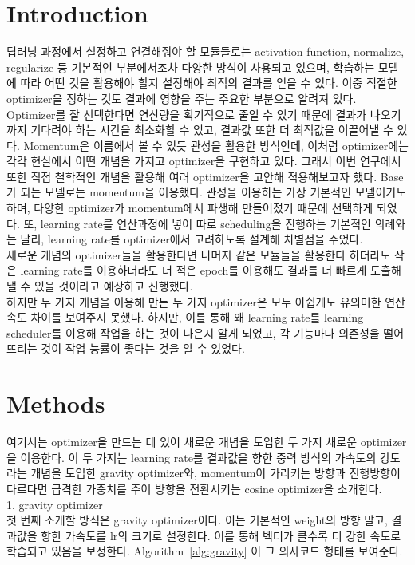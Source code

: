 \documentclass{article}
\begin{document}
\section{Introduction}
딥러닝 과정에서 설정하고 연결해줘야 할 모듈들로는 activation function, normalize, regularize 등 기본적인 부분에서조차 다양한 방식이 사용되고 있으며, 학습하는 모델에 따라 어떤 것을 활용해야 할지 설정해야 최적의 결과를 얻을 수 있다. 이중 적절한 optimizer을 정하는 것도 결과에 영향을 주는 주요한 부분으로 알려져 있다. Optimizer를 잘 선택한다면 연산량을 획기적으로 줄일 수 있기 때문에 결과가 나오기까지 기다려야 하는 시간을 최소화할 수 있고, 결과값 또한 더 최적값을 이끌어낼 수 있다. Momentum은 이름에서 볼 수 있듯 관성을 활용한 방식인데, 이처럼 optimizer에는 각각 현실에서 어떤 개념을 가지고 optimizer을 구현하고 있다. 그래서 이번 연구에서 또한 직접 철학적인 개념을 활용해 여러 optimizer을 고안해 적용해보고자 했다.
Base가 되는 모델로는 momentum을 이용했다. 관성을 이용하는 가장 기본적인 모델이기도 하며, 다양한 optimizer가 momentum에서 파생해 만들어졌기 때문에 선택하게 되었다. 또, learning rate를 연산과정에 넣어 따로 scheduling을 진행하는 기본적인 의례와는 달리, learning rate를 optimizer에서 고려하도록 설계해 차별점을 주었다.\\
새로운 개념의 optimizer들을 활용한다면 나머지 같은 모듈들을 활용한다 하더라도 작은 learning rate를 이용하더라도 더 적은 epoch를 이용해도 결과를 더 빠르게 도출해낼 수 있을 것이라고 예상하고 진행했다.\\
하지만 두 가지 개념을 이용해 만든 두 가지 optimizer은 모두 아쉽게도 유의미한 연산 속도 차이를 보여주지 못했다. 하지만, 이를 통해 왜 learning rate를 learning scheduler를 이용해 작업을 하는 것이 나은지 알게 되었고, 각 기능마다 의존성을 떨어뜨리는 것이 작업 능률이 좋다는 것을 알 수 있었다.

\section{Methods}
여기서는 optimizer을 만드는 데 있어 새로운 개념을 도입한 두 가지 새로운 optimizer을 이용한다. 이 두 가지는 learning rate를 결과값을 향한 중력 방식의 가속도의 강도라는 개념을 도입한 gravity optimizer와, momentum이 가리키는 방향과 진행방향이 다르다면 급격한 가중치를 주어 방향을 전환시키는 cosine optimizer을 소개한다.\\
1. gravity optimizer\\
첫 번째 소개할 방식은 gravity optimizer이다. 이는 기본적인 weight의 방향 말고, 결과값을 향한 가속도를 lr의 크기로 설정한다. 이를 통해 벡터가 클수록 더 강한 속도로 학습되고 있음을 보정한다. Algorithm~\ref{alg:gravity} 이 그 의사코드 형태를 보여준다.
\end{document}
